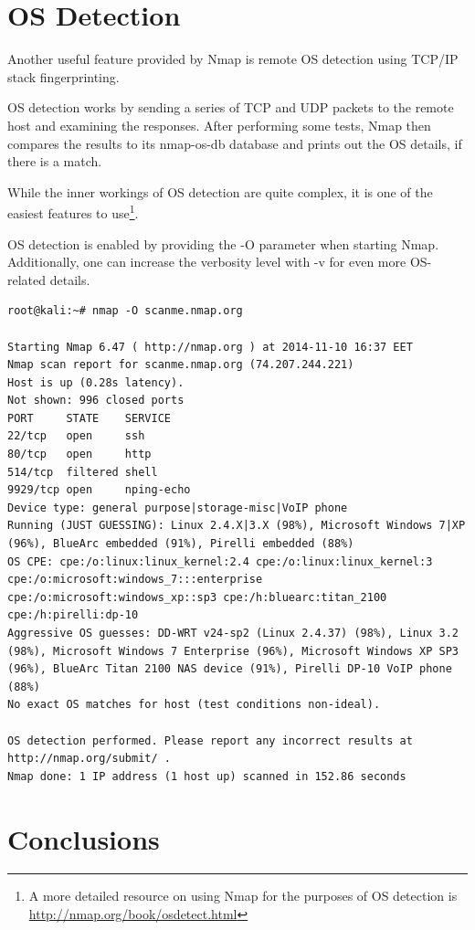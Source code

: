 \documentclass[a4paper,oneside,12pt]{book}
\begin{document}
\chapter{OS Detection}

Another useful feature provided by Nmap is remote OS detection using TCP/IP stack fingerprinting.

OS detection works by sending a series of TCP and UDP packets to the remote host and examining the responses. After performing some tests, Nmap then compares the results to its nmap-os-db database and prints out the OS details, if there is a match.

While the inner workings of OS detection are quite complex, it is one of the easiest features to use\footnote{A more detailed resource on using Nmap for the purposes of OS detection is \url{http://nmap.org/book/osdetect.html}
}.

OS detection is enabled by providing the -O parameter when starting Nmap. Additionally, one can increase the verbosity level with -v for even more OS-related details.

\begin{lstlisting}[title=A sample Nmap scan using the OS detection option]
root@kali:~# nmap -O scanme.nmap.org

Starting Nmap 6.47 ( http://nmap.org ) at 2014-11-10 16:37 EET
Nmap scan report for scanme.nmap.org (74.207.244.221)
Host is up (0.28s latency).
Not shown: 996 closed ports
PORT     STATE    SERVICE
22/tcp   open     ssh
80/tcp   open     http
514/tcp  filtered shell
9929/tcp open     nping-echo
Device type: general purpose|storage-misc|VoIP phone
Running (JUST GUESSING): Linux 2.4.X|3.X (98%), Microsoft Windows 7|XP (96%), BlueArc embedded (91%), Pirelli embedded (88%)
OS CPE: cpe:/o:linux:linux_kernel:2.4 cpe:/o:linux:linux_kernel:3 cpe:/o:microsoft:windows_7:::enterprise cpe:/o:microsoft:windows_xp::sp3 cpe:/h:bluearc:titan_2100 cpe:/h:pirelli:dp-10
Aggressive OS guesses: DD-WRT v24-sp2 (Linux 2.4.37) (98%), Linux 3.2 (98%), Microsoft Windows 7 Enterprise (96%), Microsoft Windows XP SP3 (96%), BlueArc Titan 2100 NAS device (91%), Pirelli DP-10 VoIP phone (88%)
No exact OS matches for host (test conditions non-ideal).

OS detection performed. Please report any incorrect results at http://nmap.org/submit/ .
Nmap done: 1 IP address (1 host up) scanned in 152.86 seconds
\end{lstlisting}

\chapter{Conclusions}
\end{document}
